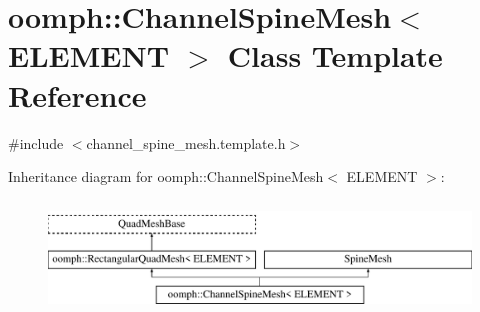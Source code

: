\hypertarget{classoomph_1_1ChannelSpineMesh}{}\section{oomph\+:\+:Channel\+Spine\+Mesh$<$ E\+L\+E\+M\+E\+NT $>$ Class Template Reference}
\label{classoomph_1_1ChannelSpineMesh}


{\ttfamily \#include $<$channel\+\_\+spine\+\_\+mesh.\+template.\+h$>$}

Inheritance diagram for oomph\+:\+:Channel\+Spine\+Mesh$<$ E\+L\+E\+M\+E\+NT $>$\+:\begin{figure}[H]
\begin{center}
\leavevmode
\includegraphics[height=3.000000cm]{classoomph_1_1ChannelSpineMesh}
\end{center}
\end{figure}
